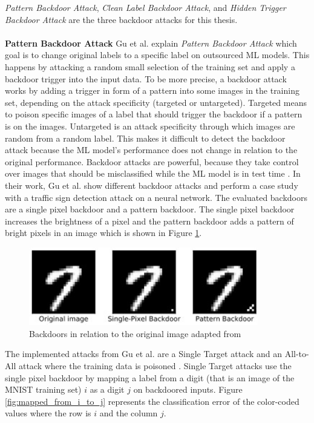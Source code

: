 \textit{Pattern Backdoor Attack}, \textit{Clean Label Backdoor Attack}, and \textit{Hidden Trigger Backdoor Attack} are the three backdoor attacks for this thesis. \\ \\
\textbf{Pattern Backdoor Attack} Gu et al. \cite{DBLP:journals/corr/abs-1708-06733} explain \textit{Pattern Backdoor Attack} which goal is to change original labels to a specific label on outsourced ML models. This happens by attacking a random small selection of the training set and apply a backdoor trigger into the input data. To be more precise, a backdoor attack works by adding a trigger in form of a pattern into some images in the training set, depending on the attack specificity (targeted or untargeted). Targeted means to poison specific images of a label that should trigger the backdoor if a pattern is on the images. Untargeted is an attack specificity through which images are random from a random label. This makes it difficult to detect the backdoor attack because the ML model's performance does not change in relation to the original performance. Backdoor attacks are powerful, because they take control over images that should be misclassified while the ML model is in test time \cite{turner2018clean}. In their work, Gu et al. show different backdoor attacks and perform a case study with a traffic sign detection attack on a neural network. The evaluated backdoors are a single pixel backdoor and a pattern backdoor. The single pixel backdoor increases the brightness of a pixel and the pattern backdoor adds a pattern of bright pixels in an image which is shown in Figure \ref{fig:backdoor_pattern}.

\begin{figure}[ht!]
  \centering
  \includegraphics[width=10cm]{pictures/backdoor_pattern_bad_net.jpg}
  \caption{Backdoors in relation to the original image adapted from \cite{DBLP:journals/corr/abs-1708-06733}}
  \label{fig:backdoor_pattern}
\end{figure}

The implemented attacks from Gu et al. are a Single Target attack and an All-to-All attack where the training data is poisoned \cite{DBLP:conf/ccs/HuangJNRT11}. Single Target attacks use the single pixel backdoor by mapping a label from a digit (that is an image of the MNIST \cite{LeCun1995LearningAF} training set) $i$ as a digit $j$ on backdoored inputs. Figure \ref{fig:mapped_from_i_to_j} represents the classification error of the color-coded values where the row is $i$ and the column $j$.

